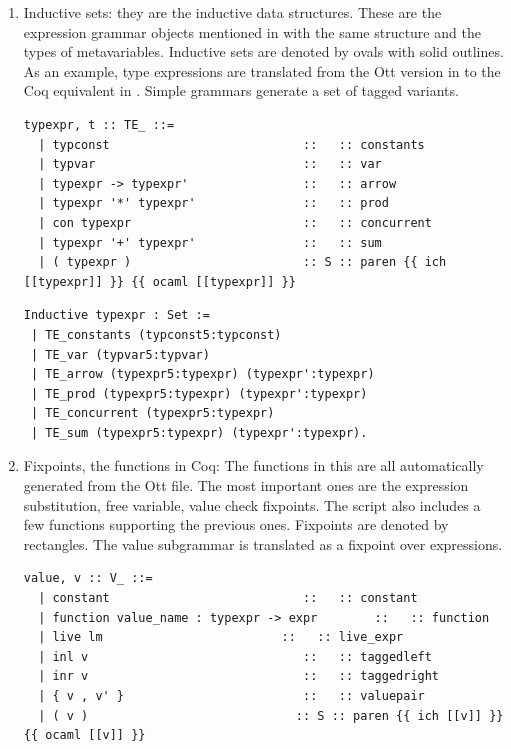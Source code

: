 \documentclass[12pt,twoside,notitlepage]{report}
\begin{document}
\begin{enumerate}
\item{Inductive sets: they are the inductive data structures. These are the expression grammar objects mentioned in  with the same structure and the types of metavariables. Inductive sets are denoted by ovals with solid outlines. As an example, type expressions are translated from the Ott version in  to the Coq equivalent in . Simple grammars generate a set of tagged variants. 


\begin{lstlisting}[language={Ott}, caption={Ott type expressions}, label={lst:otttypexpr}]
typexpr, t :: TE_ ::=
  | typconst                           ::   :: constants
  | typvar                             ::   :: var
  | typexpr -> typexpr'                ::   :: arrow
  | typexpr '*' typexpr'               ::   :: prod
  | con typexpr                        ::   :: concurrent
  | typexpr '+' typexpr'               ::   :: sum
  | ( typexpr )                        :: S :: paren {{ ich [[typexpr]] }} {{ ocaml [[typexpr]] }}
\end{lstlisting}

\begin{minipage}{\linewidth}
\begin{lstlisting}[language={Coq},caption={Coq type expr}, label={lst:coqtypexpr}]
Inductive typexpr : Set := 
 | TE_constants (typconst5:typconst)
 | TE_var (typvar5:typvar)
 | TE_arrow (typexpr5:typexpr) (typexpr':typexpr)
 | TE_prod (typexpr5:typexpr) (typexpr':typexpr)
 | TE_concurrent (typexpr5:typexpr)
 | TE_sum (typexpr5:typexpr) (typexpr':typexpr).
\end{lstlisting}
\end{minipage}
}
\item{Fixpoints, the functions in Coq: The functions in this are all automatically generated from the Ott file. The most important ones are the expression substitution, free variable, value check fixpoints. The script also includes a few functions supporting the previous ones. Fixpoints are denoted by rectangles. The value subgrammar is translated as a fixpoint over expressions. 

\begin{lstlisting}[language={Ott}, caption={Ott value subgrammar}, label={lst:ottvaluesub}]
value, v :: V_ ::=
  | constant                           ::   :: constant
  | function value_name : typexpr -> expr        ::   :: function
  | live lm                         ::   :: live_expr
  | inl v                              ::   :: taggedleft
  | inr v                              ::   :: taggedright
  | { v , v' }                         ::   :: valuepair
  | ( v )                             :: S :: paren {{ ich [[v]] }} {{ ocaml [[v]] }}
\end{lstlisting}

}
\end{enumerate}
\end{document}
